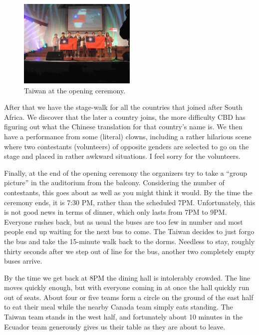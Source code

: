 \documentclass[11pt]{scrreprt}
\numberwithin{figure}{chapter}
\begin{document}
\begin{figure}[ht]
  \centering
  \includegraphics[width=0.5\textwidth]{media/opentaiwan.jpg}
  \caption{Taiwan at the opening ceremony.}
\end{figure}


After that we have the stage-walk for all the countries that joined after South Africa. We discover that the later a country joins,
the more difficulty CBD has figuring out what the Chinese translation for that country's name is.
We then have a performance from some (literal) clowns,
including a rather hilarious scene where two contestants (volunteers) of opposite genders
are selected to go on the stage and placed in rather awkward situations. I feel sorry for the volunteers.

Finally, at the end of the opening ceremony the organizers try to take a ``group picture'' in the auditorium from the balcony. Considering the number
of contestants, this goes about as well as you might think it would. By the time the ceremony ends, it is 7:30 PM, rather than the scheduled
7PM. Unfortunately, this is not good news in terms of dinner, which only lasts from 7PM to 9PM. Everyone rushes back, but as usual the buses
are too few in number and most people end up waiting for the next bus to come.
The Taiwan decides to just forgo the bus and take the 15-minute walk back to the dorms. Needless to stay, roughly thirty seconds after we
step out of line for the bus, another two completely empty buses arrive.

By the time we get back at 8PM the dining hall is intolerably crowded. The line moves quickly enough, but with everyone coming in at
once the hall quickly run out of seats. About four or five teams form a circle on the ground of the east half to eat their meal while the
nearby Canada team simply eats standing. The Taiwan team stands in the west half, and fortunately about 10 minutes in the Ecuador team
generously gives us their table as they are about to leave.
\end{document}
